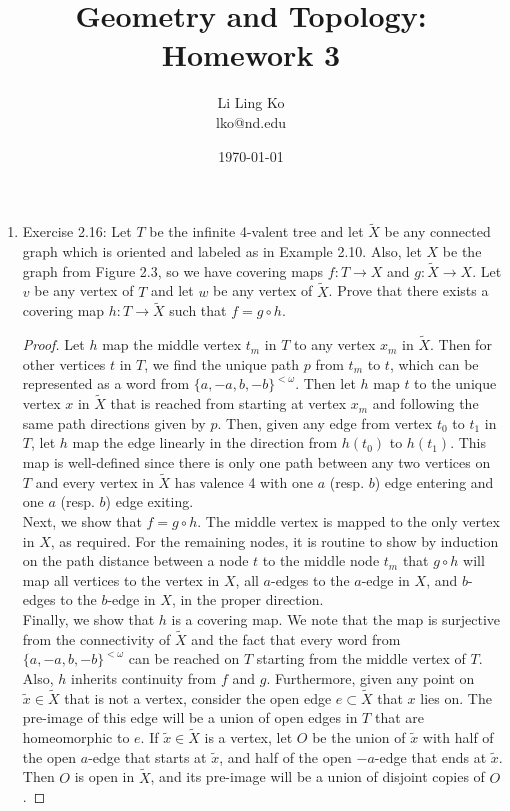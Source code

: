 \documentclass{article}
\begin{document}
\title{Geometry and Topology: Homework 3}
\author{Li Ling Ko\\ lko@nd.edu}
\date{\today}
\maketitle

\begin{enumerate}
  \item Exercise 2.16: Let $T$ be the infinite 4-valent tree and let
    $\tilde{X}$ be any connected graph which is oriented and labeled as in
    Example 2.10. Also, let $X$ be the graph from Figure 2.3, so we have
    covering maps $f:T\rightarrow X$ and $g:\tilde{X}\rightarrow X$. Let
    $v$ be any vertex of $T$ and let $w$ be any vertex of $\tilde{X}$.
    Prove that there exists a covering map $h:T\rightarrow\tilde{X}$ such
    that $f=g\circ h$.

    \begin{proof}
      Let $h$ map the middle vertex $t_m$ in $T$ to any vertex $x_m$ in
      $\tilde{X}$. Then for other vertices $t$ in $T$, we find the unique
      path $p$ from $t_m$ to $t$, which can be represented as a word from
      $\{a,-a,b,-b\}^{<\omega}$. Then let $h$ map $t$ to the unique vertex
      $x$ in $\tilde{X}$ that is reached from starting at vertex $x_m$ and
      following the same path directions given by $p$. Then, given any edge
      from vertex $t_0$ to $t_1$ in $T$, let $h$ map the edge linearly in
      the direction from $h(t_0)$ to $h(t_1)$. This map is well-defined
      since there is only one path between any two vertices on $T$ and
      every vertex in $\tilde{X}$ has valence 4 with one $a$ (resp. $b$)
      edge entering and one $a$ (resp. $b$) edge exiting. \\

      Next, we show that $f=g\circ h$. The middle vertex is mapped to the
      only vertex in $X$, as required. For the remaining nodes, it is
      routine to show by induction on the path distance between a node $t$
      to the middle node $t_m$ that $g\circ h$ will map all vertices to the
      vertex in $X$, all $a$-edges to the $a$-edge in $X$, and $b$-edges to
      the $b$-edge in $X$, in the proper direction. \\

      Finally, we show that $h$ is a covering map. We note that the map
      is surjective from the connectivity of $\tilde{X}$ and the fact that
      every word from $\{a,-a,b,-b\}^{<\omega}$ can be reached on $T$
      starting from the middle vertex of $T$. Also, $h$ inherits continuity
      from $f$ and $g$. Furthermore, given any point on $\tilde{x}\in\tilde{X}$
      that is not a vertex, consider the open edge $e\subset\tilde{X}$ that
      $x$ lies on. The pre-image of this edge will be a union of open edges
      in $T$ that are homeomorphic to $e$.  If $\tilde{x}\in\tilde{X}$ is a
      vertex, let $O$ be the union of $\tilde{x}$ with half of the open
      $a$-edge that starts at $\tilde{x}$, and half of the open $-a$-edge
      that ends at $\tilde{x}$. Then $O$ is open in $\tilde{X}$, and its
      pre-image will be a union of disjoint copies of $O$.
    \end{proof}


\end{enumerate}
\end{document}
